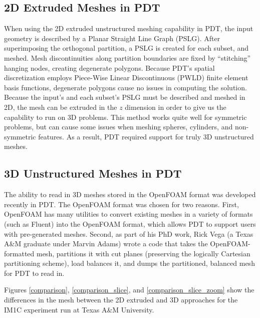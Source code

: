 \documentclass[11pt, letterpaper,titlepage,oneside]{article}
\begin{document}
\subsection{2D Extruded Meshes in PDT}

When using the 2D extruded unstructured meshing capability in PDT, the input geometry is described by a Planar Straight Line Graph (PSLG). After superimposing the orthogonal partition, a PSLG is created for each subset, and meshed. Mesh discontinuities along partition boundaries are fixed by ``stitching'' hanging nodes, creating degenerate polygons. Because PDT's spatial discretization employs Piece-Wise Linear Discontinuous (PWLD) finite element basis functions, degenerate polygons cause no issues in computing the solution.  Because the input's and each subset's PSLG must be described and meshed in 2D, the mesh can be extruded in the $z$ dimension in order to give us the capability to run on 3D problems. This method works quite well for symmetric problems, but can cause some issues when meshing spheres, cylinders, and non-symmetric features. As a result, PDT required support for truly 3D unstructured meshes.

\subsection{3D Unstructured Meshes in PDT}

The ability to read in 3D meshes stored in the OpenFOAM format was developed recently in PDT. The OpenFOAM format was chosen for two reasons. First, OpenFOAM has many utilities to convert existing meshes in a variety of formats (such as Fluent) into the OpenFOAM format, which allows PDT to support users with pre-generated meshes. Second, as part of his PhD work, Rick Vega (a Texas A\&M graduate under Marvin Adams) wrote a code that takes the OpenFOAM-formatted mesh, partitions it with cut planes (preserving the logically Cartesian partitioning scheme), load balances it, and dumps the partitioned, balanced mesh for PDT to read in. 

Figures \ref{comparison}, \ref{comparison_slice}, and \ref{comparison_slice_zoom} show the differences in the mesh between the 2D extruded and 3D approaches for the IM1C experiment run at Texas A\&M University.
\end{document}
